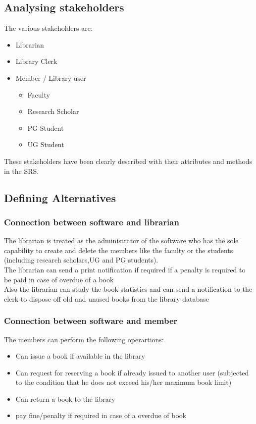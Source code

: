 \documentclass{article}
\begin{document}
\subsection{Analysing stakeholders}
The various stakeholders are:
\begin{itemize}
\item Librarian
\item Library Clerk
\item Member / Library user
	\begin{itemize}
	\item Faculty
	\item Research Scholar
	\item PG Student
	\item UG Student
	\end{itemize}
\end{itemize}
These stakeholders have been clearly described with their attributes and methods in the SRS.
\subsection{Defining Alternatives}
\subsubsection{Connection between software and librarian}
The librarian is treated as the administrator of the software who has the sole capability to create and delete the members like the faculty or the students (including research scholars,UG and PG students).
\\The librarian can  send a print notification if required if a penalty is required to be paid in case of overdue of a book
\\Also the librarian can study the book statistics and can send a notification to the clerk to dispose off old and unused books from the library database
\subsubsection{Connection between software and member}
The members can perform the following operartions:
\begin{itemize}
\item Can issue a book if available in the library
\item Can request for reserving a book if already issued to another user (subjected to the condition that he does not exceed his/her maximum book limit)
\item Can return a book to the library
\item pay fine/penalty if required in case of a overdue of book
\end{itemize}
\end{document}
